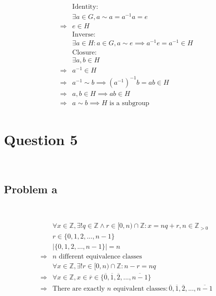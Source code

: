 \documentclass{article}
\begin{document}
~

\begin{equation*}
    \begin{split}
        &\text{Identity}:\\
        &\exists a\in G,a \sim a=a^{-1}a=e\\
        \Rightarrow&e\in H\\
        &\text{Inverse}:\\
        &\exists a\in H:a\in G,a\sim e\implies a^{-1}e =a^{-1}\in H\\
        &\text{Closure}:\\
        &\exists a,b\in H\\
        \Rightarrow&a^{-1}\in H\\
        \Rightarrow&a^{-1}\sim b\implies (a^{-1})^{-1}b=ab\in H\\
        \Rightarrow&a,b\in H\implies ab\in H\\
        \Rightarrow&a\sim b\implies H\text{ is a subgroup}\\
    \end{split}
\end{equation*}

\newpage

\section*{Question 5}

~

\subsection*{Problem a}

~

\begin{equation*}
    \begin{split}
        &\forall x\in\mathbb{Z} ,\exists! q\in\mathbb{Z} \land r\in[0,n)\cap\mathbb{Z} :x=nq+r,n \in \mathbb{Z} _{>0}\\
        &r\in\{0,1,2,...,n-1\}\\
        &|\{0,1,2,...,n-1\}|=n\\
        \Rightarrow&n\text{ different equivalence classes}\\
        &\forall x\in\mathbb{Z} ,\exists !r\in[0,n)\cap\mathbb{Z}:n-r=nq\\
        \Rightarrow&\forall x\in\mathbb{Z} ,x\in \overline{r}\in\{\overline{0},\overline{1},\overline{2},...,\overline{n-1}\}\\
        \Rightarrow&\text{There are exactly }n\text { equivalent classes}:\overline{0},\overline{1},\overline{2},...,\overline{n-1}\\
    \end{split}
\end{equation*}
\end{document}
